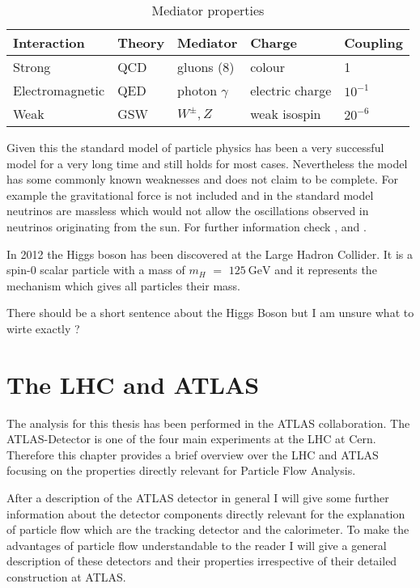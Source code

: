 \begin{table}[h]
\centering
\renewcommand{\arraystretch}{1.5}
\begin{tabular}{|l|l|l|l|l|}
\hline
Interaction     & Theory & Mediator        & Charge          & Coupling  \\ \hline
Strong          & QCD    & gluons (8)      & colour          & 1         \\ \hline
Electromagnetic & QED    & photon $\gamma$ & electric charge & $10^{-1}$ \\ \hline
Weak            & GSW    & $W^{\pm}, Z$    & weak isospin    & $20^{-6}$ \\ \hline
\end{tabular}
\caption{Mediator properties}
\label{mediator properties}
\end{table}

Given this the standard model of particle physics has been a very successful model for a very long time and still holds for most cases.
Nevertheless the model has some commonly known weaknesses and does not claim to be complete. For example the gravitational force is not included and in the standard model neutrinos are massless which would not allow the oscillations observed in neutrinos originating from the sun.
For further information check \cite{griffith08}, \cite{thomson13} and \cite{brock11}.

In 2012 the Higgs boson has been discovered at the Large Hadron Collider. It is a spin-0 scalar particle with a mass of $m_H$ $=$ $\SI{125}{\GeV}$ and it represents the mechanism which gives all particles their mass.

There should be a short sentence about the Higgs Boson but I am unsure what to wirte exactly ? 
\newpage





\section{The LHC and ATLAS}

The analysis for this thesis has been performed in the ATLAS collaboration. The ATLAS-Detector is one of the four main experiments at the LHC at Cern. Therefore this chapter provides a brief overview over the LHC and ATLAS focusing on the properties directly relevant for Particle Flow Analysis.

After a description of the ATLAS detector in general I will give some further information about the detector components directly relevant for the explanation of particle flow which are the tracking detector and the calorimeter. To make the advantages of particle flow understandable to the reader I will give a general description of these detectors and their properties irrespective of their detailed construction at ATLAS.

